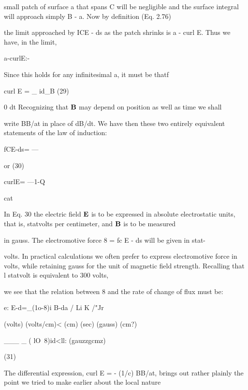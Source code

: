 small patch of surface a that spans C will be negligible and the surface
integral will approach simply B - a. Now by definition (Eq. 2.76)

the limit approached by ICE - ds as the patch shrinks is a - curl E.
Thus we have, in the limit,

\begin{equation}
\end{equation}
a-curlE:-%

Since this holds for any infinitesimal a, it must be thatf

\begin{equation}
\end{equation}
curl E = _ id_B (29)

0 dt
Recognizing that $\mathbf{B}$ may depend on position as well as time we shall

write BB/at in place of dB/dt. We have then these two entirely
equivalent statements of the law of induction:

\begin{equation}
\end{equation}
fCE-ds= ---%

or (30)

curlE= ---1-Q

cat

In Eq. 30 the electric field $\mathbf{E}$ is to be expressed in absolute electrostatic
units, that is, statvolts per centimeter, and $\mathbf{B}$ is to be measured

in gauss. The electromotive force 8 = fc E - ds will be given in stat-

volts. In practical calculations we often prefer to express electromotive
force in volts, while retaining gauss for the unit of magnetic
field strength. Recalling that l statvolt is equivalent to 300 volts,

we see that the relation between 8 and the rate of change of flux
must be:

\begin{equation}
\end{equation}
e: E-d=_(1o-8)i B-da
/ Li K /"Jr \

(volts) (volts/cm)< (cm) (sec) (gauss) (cm?)

___ _ ( lO~8)id<ll: (gauzzgcmz)

(31)

The differential expression, curl E = - (1/c) BB/at, brings out
rather plainly the point we tried to make earlier about the local nature

